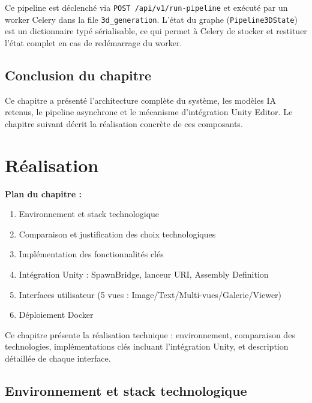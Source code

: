 \documentclass[12pt,a4paper,oneside]{report}
\newcommand{\chapterintro}[2]{%
  \begin{tcolorbox}[colback=tekupblue!4,colframe=tekupblue!40,
    boxrule=0.6pt,arc=4pt,left=10pt,right=10pt,top=6pt,bottom=6pt]
  \small\textbf{Plan du chapitre :}\\[3pt]#1
  \end{tcolorbox}
  \vspace{6pt}\noindent #2\vspace{10pt}
}
\begin{document}
Ce pipeline est déclenché via \texttt{POST /api/v1/run-pipeline} et
exécuté par un worker Celery dans la file \texttt{3d\_generation}.
L'état du graphe (\texttt{Pipeline3DState}) est un dictionnaire typé
sérialisable, ce qui permet à Celery de stocker et restituer l'état
complet en cas de redémarrage du worker.

\section*{Conclusion du chapitre}

Ce chapitre a présenté l'architecture complète du système, les modèles IA
retenus, le pipeline asynchrone et le mécanisme d'intégration Unity Editor. Le chapitre
suivant décrit la réalisation concrète de ces composants.

\chapter{Réalisation}

\chapterintro{%
  \begin{enumerate}[noitemsep,leftmargin=*]
    \item Environnement et stack technologique
    \item Comparaison et justification des choix technologiques
    \item Implémentation des fonctionnalités clés
    \item Intégration Unity : SpawnBridge, lanceur URI, Assembly Definition
    \item Interfaces utilisateur (5 vues : Image/Text/Multi-vues/Galerie/Viewer)
    \item Déploiement Docker
  \end{enumerate}
}{%
  Ce chapitre présente la réalisation technique : environnement,
  comparaison des technologies, implémentations clés incluant
  l'intégration Unity, et description détaillée de chaque interface.
}

\section{Environnement et stack technologique}
\end{document}
